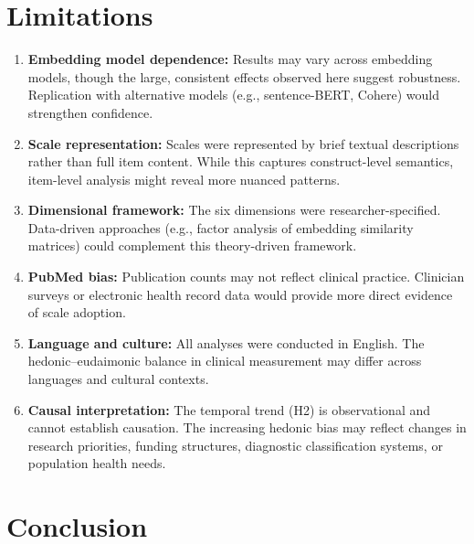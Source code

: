 \documentclass[12pt,a4paper]{article}
\begin{document}
\section{Limitations}\label{sec:limitations}

\begin{enumerate}
    \item \textbf{Embedding model dependence:} Results may vary across embedding models, though the large, consistent effects observed here suggest robustness. Replication with alternative models (e.g., sentence-BERT, Cohere) would strengthen confidence.
    
    \item \textbf{Scale representation:} Scales were represented by brief textual descriptions rather than full item content. While this captures construct-level semantics, item-level analysis might reveal more nuanced patterns.
    
    \item \textbf{Dimensional framework:} The six dimensions were researcher-specified. Data-driven approaches (e.g., factor analysis of embedding similarity matrices) could complement this theory-driven framework.
    
    \item \textbf{PubMed bias:} Publication counts may not reflect clinical practice. Clinician surveys or electronic health record data would provide more direct evidence of scale adoption.
    
    \item \textbf{Language and culture:} All analyses were conducted in English. The hedonic--eudaimonic balance in clinical measurement may differ across languages and cultural contexts.
    
    \item \textbf{Causal interpretation:} The temporal trend (H2) is observational and cannot establish causation. The increasing hedonic bias may reflect changes in research priorities, funding structures, diagnostic classification systems, or population health needs.
\end{enumerate}

\section{Conclusion}\label{sec:conclusion}
\end{document}
